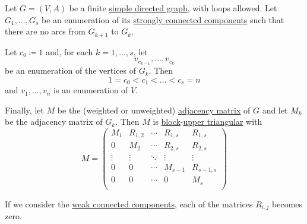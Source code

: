 \begin{proposition}\label{thm:adjacency_matrix_components}
  Let \( G = (V, A) \) be a finite \hyperref[def:directed_graph]{simple directed graph}, with loops allowed. Let \( G_1, \ldots, G_s \) be an enumeration of its \hyperref[def:graph_connectedness/strong]{strongly connected components} such that there are no arcs from \( G_{k+1} \) to \( G_k \).

  Let \( c_0 \coloneqq 1 \) and, for each \( k = 1, \ldots, s \), let
  \begin{equation*}
    v_{c_{k-1}}, \ldots, v_{c_k}
  \end{equation*}
  be an enumeration of the vertices of \( G_k \). Then
  \begin{equation*}
    1 = c_0 < c_1 < \ldots < c_s = n
  \end{equation*}
  and \( v_1, \ldots, v_n \) is an enumeration of \( V \).

  Finally, let \( M \) be the (weighted or unweighted) \hyperref[def:graph_adjacency_matrix]{adjacency matrix} of \( G \) and let \( M_k \) be the adjacency matrix of \( G_k \). Then \( M \) is \hyperref[def:block_matrix]{block}-\hyperref[def:triangular_matrix]{upper triangular} with
  \begin{equation}\label{eq:thm:adjacency_matrix_components}
    M = \begin{pmatrix}
      M_1    & R_{1,2} & \cdots & R_{1,s} & R_{1,s}   \\
      0      & M_2     & \cdots & R_{2,s} & R_{2,s}   \\
      \vdots & \vdots  & \ddots & \vdots  & \vdots    \\
      0      & 0       & \cdots & M_{s-1} & R_{s-1,s} \\
      0      & 0       & \cdots & 0       & M_s       \\
    \end{pmatrix}
  \end{equation}

  If we consider the \hyperref[def:graph_connectedness/weak]{weak connected components}, each of the matrices \( R_{i,j} \) becomes zero.
\end{proposition}
